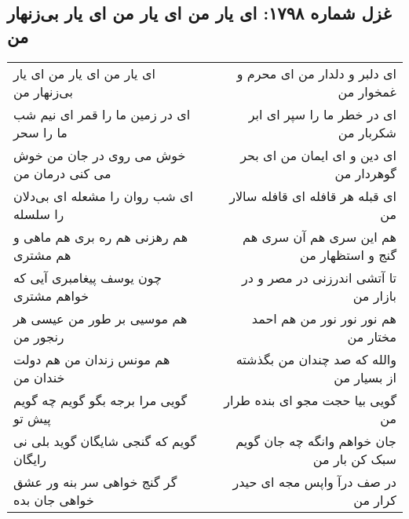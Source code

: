\begin{center}
\section*{غزل شماره ۱۷۹۸: ای یار من ای یار من ای یار بی‌زنهار من}
\label{sec:1798}
\begin{longtable}{l p{0.5cm} r}
ای یار من ای یار من ای یار بی‌زنهار من
&&
ای دلبر و دلدار من ای محرم و غمخوار من
\\
ای در زمین ما را قمر ای نیم شب ما را سحر
&&
ای در خطر ما را سپر ای ابر شکربار من
\\
خوش می روی در جان من خوش می کنی درمان من
&&
ای دین و ای ایمان من ای بحر گوهردار من
\\
ای شب روان را مشعله ای بی‌دلان را سلسله
&&
ای قبله هر قافله ای قافله سالار من
\\
هم رهزنی هم ره بری هم ماهی و هم مشتری
&&
هم این سری هم آن سری هم گنج و استظهار من
\\
چون یوسف پیغامبری آیی که خواهم مشتری
&&
تا آتشی اندرزنی در مصر و در بازار من
\\
هم موسیی بر طور من عیسی هر رنجور من
&&
هم نور نور نور من هم احمد مختار من
\\
هم مونس زندان من هم دولت خندان من
&&
والله که صد چندان من بگذشته از بسیار من
\\
گویی مرا برجه بگو گویم چه گویم پیش تو
&&
گویی بیا حجت مجو ای بنده طرار من
\\
گویم که گنجی شایگان گوید بلی نی رایگان
&&
جان خواهم وانگه چه جان گویم سبک کن بار من
\\
گر گنج خواهی سر بنه ور عشق خواهی جان بده
&&
در صف درآ واپس مجه ای حیدر کرار من
\\
\end{longtable}
\end{center}
